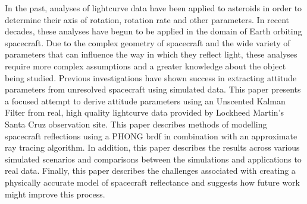 In the past, analyses of lightcurve data have been applied to asteroids in order to determine their axis of rotation, rotation rate and other parameters. In recent decades, these analyses have begun to be applied in the domain of Earth orbiting spacecraft. Due to the complex geometry of spacecraft and the wide variety of parameters that can influence the way in which they reflect light, these analyses require more complex assumptions and a greater knowledge about the object being studied. Previous investigations have shown success in extracting attitude parameters from unresolved spacecraft using simulated data. This paper presents a focused attempt to derive attitude parameters using an Unscented Kalman Filter from real, high quality lightcurve data provided by Lockheed Martin's Santa Cruz observation site. This paper describes methods of modelling spacecraft reflections using a PHONG brdf in combination with an approximate ray tracing algorithm. In addition, this paper describes the results across various simulated scenarios and comparisons between the simulations and applications to real data. Finally, this paper describes the challenges associated with creating a physically accurate model of spacecraft reflectance and suggests how future work might improve this process.
